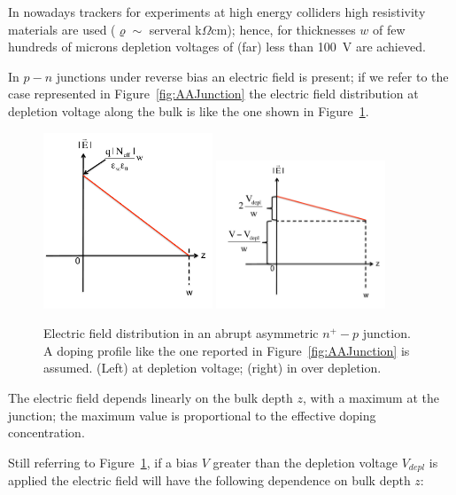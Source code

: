 In nowadays trackers for experiments at high energy colliders
 high resistivity materials are used ($\varrho\sim$
 serveral k$\Omega$cm); hence, for thicknesses $w$ of few hundreds of microns depletion voltages of 
 (far) less than 100~V are achieved.

In $p-n$ junctions under reverse bias an electric field is present; if we refer to the case represented 
in Figure~\ref{fig:AAJunction} the electric field distribution at depletion voltage along the bulk is like 
the one shown in Figure~\ref{fig:AAEField}.

\begin{figure}[htbp]
   \centering
   \includegraphics[width=0.45\textwidth]{E_Abrupt_Junction.pdf} 
    \includegraphics[width=0.45\textwidth]{Overdepleted_E_Abrupt_Junction.pdf}
   \caption{\label{fig:AAEField}Electric field distribution in an abrupt asymmetric $n^+-p$ junction.
   A doping profile like the one reported in Figure~\ref{fig:AAJunction} is assumed. (Left) at 
   depletion voltage; (right) in over depletion.}
\end{figure}
The electric field depends linearly on the bulk depth $z$, with a maximum at the 
junction; the maximum value is proportional to the effective doping concentration.

Still referring to Figure~\ref{fig:AAEField}, if a bias $V$ greater than the depletion 
voltage $V_{depl}$ is applied the electric field will 
have the following dependence on bulk depth $z$:

